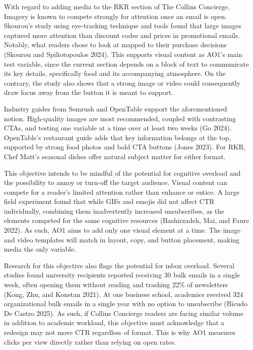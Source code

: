 \documentclass[
  12pt,
  letterpaper,
  DIV=11,
  numbers=noendperiod]{scrartcl}
\begin{document}
With regard to adding media to the RKR section of The Collins Concierge,
Imagery is known to compete strongly for attention once an email is
open. Skourou's study using eye-tracking technique and tools found that
large images captured more attention than discount codes and prices in
promotional emails. Notably, what readers chose to look at mapped to
their purchase decisions (Skourou and Spiliotopoulos 2024). This
supports visual content as AO1's main test variable, since the current
section depends on a block of text to communicate its key details,
specifically food and its accompanying atmosphere. On the contrary, the
study also shows that a strong image or video could consequently draw
focus away from the button it is meant to support.

Industry guides from Semrush and OpenTable support the aforementioned
notion. High-quality images are most recommended, coupled with
contrasting CTAs, and testing one variable at a time over at least two
weeks (Go 2024). OpenTable's restaurant guide adds that key information
belongs at the top, supported by strong food photos and bold CTA buttons
(Jones 2023). For RKR, Chef Matt's seasonal dishes offer natural subject
matter for either format.

This objective intends to be mindful of the potential for cognitive
overload and the possibility to annoy or turn-off the target audience.
Visual content can compete for a reader's limited attention rather than
enhance or entice. A large field experiment found that while GIFs and
emojis did not affect CTR individually, combining them inadvertently
increased unsubscribes, as the elements competed for the same cognitive
resources (Bashirzadeh, Mai, and Faure 2022). As such, AO1 aims to add
only one visual element at a time. The image and video templates will
match in layout, copy, and button placement, making media the only
variable.

Research for this objective also flags the potential for inbox overload.
Several studies found university recipients reported receiving 30 bulk
emails in a single week, often opening them without reading and trashing
22\% of newsletters (Kong, Zhu, and Konstan 2021). At one business
school, academics received 324 organizational bulk emails in a single
year with no option to unsubscribe (Bicudo De Castro 2025). As such, if
Collins Concierge readers are facing similar volume in addition to
academic workload, this objective must acknowledge that a redesign may
not move CTR regardless of format. This is why AO1 measures clicks per
view directly rather than relying on open rates.
\end{document}
